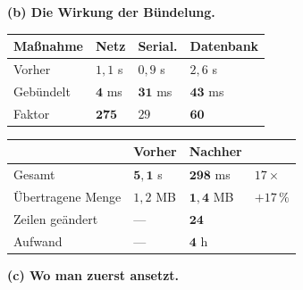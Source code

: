 \begin{aufgabe}
\medskip
\textbf{(b) Die Wirkung der Bündelung.}

\begin{center}
{\small
\renewcommand{\arraystretch}{1.45}
\begin{tabular}{@{}P{2.4cm}P{1.8cm}P{1.8cm}P{2.2cm}@{}}
\toprule
\textbf{Maßnahme} & \textbf{Netz} & \textbf{Serial.} & \textbf{Datenbank}\\
\midrule
Vorher & $1{,}1$ s & $0{,}9$ s & $2{,}6$ s\\
Gebündelt & $\mathbf{4}$ ms & $\mathbf{31}$ ms & $\mathbf{43}$ ms\\
Faktor & $\mathbf{275}$ & $29$ & $\mathbf{60}$\\
\bottomrule
\end{tabular}}
\end{center}

\begin{center}
\begin{minipage}{0.88\textwidth}
\end{minipage}
\end{center}

\begin{center}
\renewcommand{\arraystretch}{1.45}
\begin{tabular}{@{}P{2.8cm}P{2.2cm}P{2.4cm}P{1.8cm}@{}}
\toprule
& \textbf{Vorher} & \textbf{Nachher} & \\
\midrule
Gesamt & $\mathbf{5{,}1}$ s & $\mathbf{298}$ ms & $17\times$\\
Übertragene Menge & $1{,}2$ MB & $\mathbf{1{,}4}$ MB & \textcolor{mittel}{$+17\,\%$}\\
Zeilen geändert & --- & $\mathbf{24}$ & \\
Aufwand & --- & $\mathbf{4}$ h & \\
\bottomrule
\end{tabular}
\end{center}

\begin{center}
\end{center}

\medskip
\textbf{(c) Wo man zuerst ansetzt.}


\end{aufgabe}
